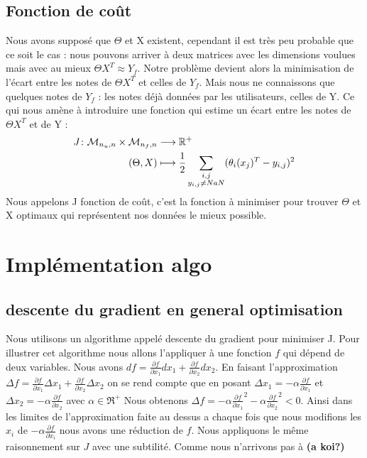 \documentclass[a4paper,10pt]{article}
\begin{document}
\subsection{Fonction de coût}

Nous avons supposé que $\Theta$ et X existent, cependant il est très peu probable que ce soit le cas : nous pouvons arriver à deux matrices avec les dimensions voulues mais avec au mieux $\Theta X^T \approx Y_f$. Notre problème devient alors la minimisation de l'écart entre les notes de $\Theta X^T$ et celles de $Y_f$. Mais nous ne connaissons que quelques notes de $Y_f$ : les notes déjà données par les utilisateurs, celles de Y. Ce qui nous amène à introduire une fonction qui estime un écart entre les notes de $\Theta X^T$ et de Y :
\begin{align*}
J\colon{\cal M}_{n_u, n} \times {\cal M}_{n_f, n} &\longrightarrow \mathbb{R}^+\\
(\Theta, X)&\longmapsto \frac{1}{2}\sum_{\substack{i,j \\ y_{i,j} \ne NaN}}(\theta_{i}(x_{j})^{T}-y_{i,j})^{2}
\end{align*}
Nous appelons J fonction de coût, c'est la fonction à minimiser pour trouver $\Theta$ et X optimaux qui représentent nos données le mieux possible.

\section{Implémentation algo}
\subsection{descente du gradient en general optimisation}
Nous utilisons un algorithme appelé descente du gradient pour minimiser J. Pour illustrer cet algorithme nous allons l'appliquer 
à une fonction $f$ qui dépend de deux variables.%
 Nous avons $df = \frac{\partial f}{\partial x_{1}}d x_{1} + \frac{\partial f}{\partial x_{2}}dx_{2}$. En faisant l'approximation
 $\Delta f = \frac{\partial f}{\partial x_{1}}\Delta  x_{1} + \frac{\partial f}{\partial x_{2}}\Delta x_{2}$ on se rend compte
 que en posant $\Delta x_{1} = -\alpha \frac{\partial f}{\partial x_{1}}$
 et $\Delta x_{2} = -\alpha \frac{\partial f}{\partial x_{2}}$ avec $\alpha \in \Re^{+}$
 Nous obtenons $\Delta f = -\alpha \frac{\partial f}{\partial x_{1}}^{2} - \alpha \frac{\partial f}{\partial x_{2}}^{2} < 0$. Ainsi dans
 les limites de l'approximation faite au dessus a chaque fois que nous modifions les $x_{i}$ de $- \alpha \frac{\partial f}{\partial x_{i}}$
 nous avons une réduction de $f$.
Nous appliquons le même raisonnement sur $J$ avec une subtilité. Comme nous n'arrivons pas à \textbf{(a koi?)}
\end{document}
